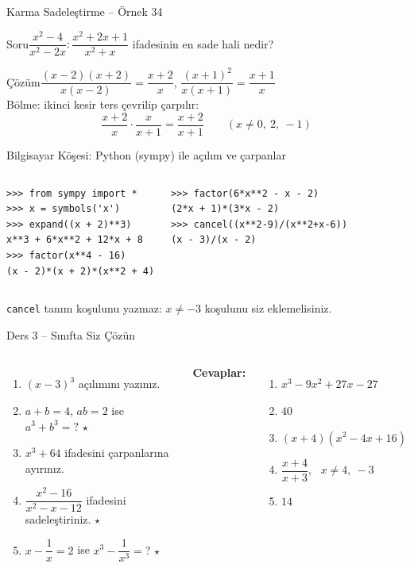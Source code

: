 \documentclass[aspectratio=169,11pt,handout]{beamer}
\newcommand{\soru}[3]{%
\begin{frame}{#1}
  \begin{block}{Soru}\large #2\end{block}
  \pause
  \begin{exampleblock}{Çözüm}\large #3\end{exampleblock}
\end{frame}}
\begin{document}
\soru{Karma Sadeleştirme -- Örnek 34}
{\(\dfrac{x^2-4}{x^2-2x}:\dfrac{x^2+2x+1}{x^2+x}\) ifadesinin en sade hali nedir?}
{\(\dfrac{(x-2)(x+2)}{x(x-2)}=\dfrac{x+2}{x}\), \quad \(\dfrac{(x+1)^2}{x(x+1)}=\dfrac{x+1}{x}\)\\[3pt]
Bölme: ikinci kesir ters çevrilip çarpılır:
\[\frac{x+2}{x}\cdot\frac{x}{x+1}=\frac{x+2}{x+1}\qquad(x\neq 0,\ 2,\ -1)\]}

\begin{frame}[fragile]{Bilgisayar Köşesi: Python (sympy) ile açılım ve çarpanlar}
\begin{columns}[t]
\begin{verbatim}
>>> from sympy import *
>>> x = symbols('x')
>>> expand((x + 2)**3)
x**3 + 6*x**2 + 12*x + 8
>>> factor(x**4 - 16)
(x - 2)*(x + 2)*(x**2 + 4)
\end{verbatim}
\begin{verbatim}
>>> factor(6*x**2 - x - 2)
(2*x + 1)*(3*x - 2)
>>> cancel((x**2-9)/(x**2+x-6))
(x - 3)/(x - 2)
\end{verbatim}
\end{columns}
\small \verb|cancel| tanım koşulunu yazmaz: \(x\neq -3\) koşulunu siz eklemelisiniz.
\end{frame}

\begin{frame}{Ders 3 -- Sınıfta Siz Çözün}
\begin{columns}[t]
\begin{enumerate}
\item \((x-3)^3\) açılımını yazınız.
\item \(a+b=4\), \(ab=2\) ise \(a^3+b^3=?\) \(\star\)
\item \(x^3+64\) ifadesini çarpanlarına ayırınız.
\item \(\dfrac{x^2-16}{x^2-x-12}\) ifadesini sadeleştiriniz. \(\star\)
\item \(x-\dfrac{1}{x}=2\) ise \(x^3-\dfrac{1}{x^3}=?\) \(\star\)
\end{enumerate}
\pause
\textbf{Cevaplar:}
\begin{enumerate}
\item \(x^3-9x^2+27x-27\)
\item \(40\)
\item \((x+4)(x^2-4x+16)\)
\item \(\dfrac{x+4}{x+3}\), \ \(x\neq 4,\ -3\)
\item \(14\)
\end{enumerate}
\end{columns}
\vspace{4pt}{\footnotesize \(\star\) işaretli soruların adım adım çözümü sonraki slaytlardadır.}
\end{frame}
\end{document}
